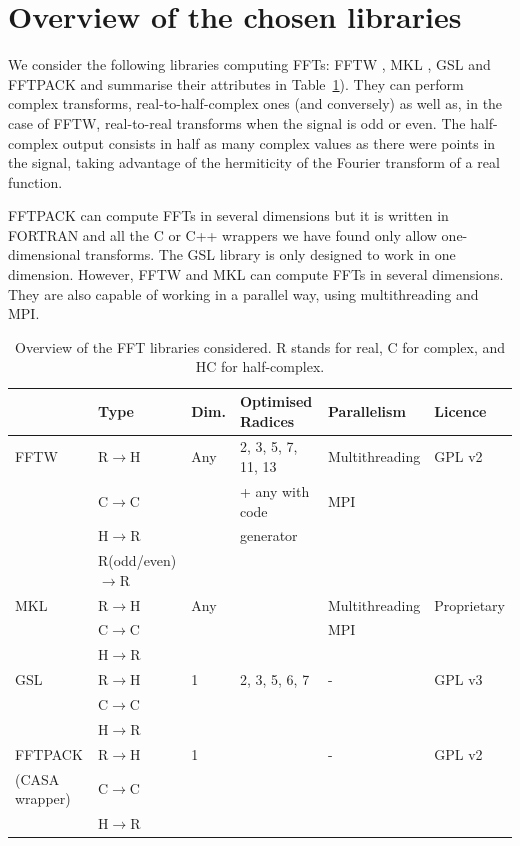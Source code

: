 \documentclass[12pt, a4paper]{article} \setlength{\textheight}{24cm}
\begin{document}
\section{Overview of the chosen libraries}
We consider the following libraries computing FFTs: FFTW \cite{fftw},
MKL \cite{mkl}, GSL \cite{gsl} and FFTPACK \cite{fftpack} and
summarise their attributes in Table~\ref{ffttable}). They can perform
complex transforms, real-to-half-complex ones (and conversely) as well
as, in the case of FFTW, real-to-real transforms when the signal is
odd or even. The half-complex output consists in half as many complex
values as there were points in the signal, taking advantage of the
hermiticity of the Fourier transform of a real function.

FFTPACK can compute FFTs in several dimensions but it is written in
FORTRAN and all the C or C++ wrappers we have found only allow
one-dimensional transforms. The GSL library is only designed to work
in one dimension. However, FFTW and MKL can compute FFTs in several
dimensions. They are also capable of working in a parallel way, using
multithreading and MPI.
\begin{table}[H]
  \captionsetup{width=1\textwidth}
  \begin{tabular}{|l||l|l|l|l|l|}
    \hline
    & Type & Dim. & Optimised Radices & Parallelism & Licence \\
    \hline
    \hline
    FFTW & R$\to$H & Any & 2, 3, 5, 7, 11, 13  & Multithreading  & GPL v2\\
    & C$\to$C & & + any with code & MPI &  \\
    &  H$\to$R & &  generator & &  \\
    & R{\scriptsize (odd/even)}$\to$R & & & &  \\
    \hline
    MKL  &  R$\to$H & Any & & Multithreading & Proprietary\\
    & C$\to$C & & & MPI &  \\
    &  H$\to$R & & & &  \\
    \hline
    GSL  &  R$\to$H & 1 & 2, 3, 5, 6, 7 & - & GPL v3\\
    & C$\to$C & & & &  \\
    &  H$\to$R & & & &  \\
    \hline
    FFTPACK  &  R$\to$H  & 1 & & - & GPL v2\\
    {\scriptsize (CASA wrapper)} & C$\to$C & & & &  \\
    &  H$\to$R & & & &  \\
    \hline
  \end{tabular}
  \caption{Overview of the FFT libraries considered. R stands for real, C for complex, and HC for half-complex.}
  \label{ffttable}
\end{table}
\end{document}

